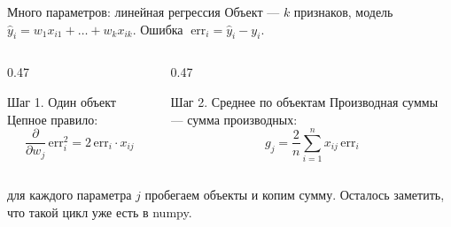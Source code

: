 \begin{frame}[c]{Много параметров: линейная регрессия}
  \small
  Объект --- $k$ признаков, модель $\hat y_i = w_1 x_{i1} + \dots + w_k x_{ik}$. Ошибка
  $\;\mathrm{err}_i = \hat y_i - y_i$.

  \medskip
  \begin{columns}[T]
    \begin{column}{0.47\textwidth}
      \begin{block}{Шаг 1. Один объект}
        \small
        Цепное правило:
        \[\frac{\partial}{\partial w_j}\,\mathrm{err}_i^2 = 2\,\mathrm{err}_i\cdot x_{ij}\]
      \end{block}
    \end{column}
    \begin{column}{0.47\textwidth}
      \begin{block}{Шаг 2. Среднее по объектам}
        \small
        Производная суммы --- сумма производных:
        \[g_j = \frac{2}{n}\sum_{i=1}^{n} x_{ij}\,\mathrm{err}_i\]
      \end{block}
    \end{column}
  \end{columns}

  \medskip
   для каждого параметра $j$ пробегаем объекты и копим сумму.
  Осталось заметить, что такой цикл уже есть в numpy.
\end{frame}

